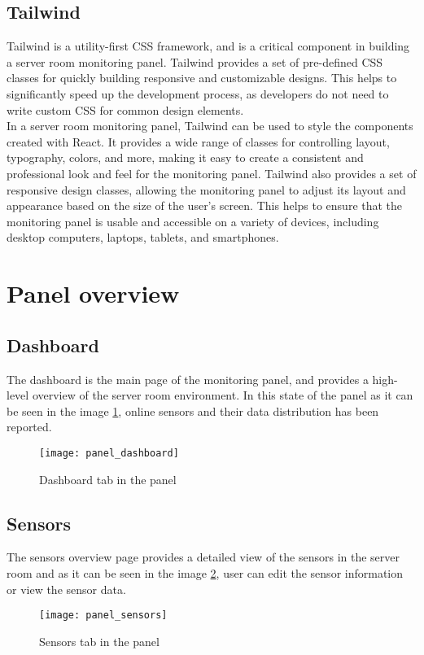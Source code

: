     \subsection{Tailwind}
    Tailwind is a utility-first CSS framework, and is a critical component in building a server room monitoring panel. Tailwind provides a set of pre-defined CSS classes for quickly building responsive and customizable designs. This helps to significantly speed up the development process, as developers do not need to write custom CSS for common design elements.\\
    In a server room monitoring panel, Tailwind can be used to style the components created with React. It provides a wide range of classes for controlling layout, typography, colors, and more, making it easy to create a consistent and professional look and feel for the monitoring panel. Tailwind also provides a set of responsive design classes, allowing the monitoring panel to adjust its layout and appearance based on the size of the user's screen. This helps to ensure that the monitoring panel is usable and accessible on a variety of devices, including desktop computers, laptops, tablets, and smartphones.\cite{tailwind}

\section{Panel overview}
    \subsection{Dashboard}
    The dashboard is the main page of the monitoring panel, and provides a high-level overview of the server room environment. In this state of the panel as it can be seen in the image \ref{panel_dashboard}, online sensors and their data distribution has been reported.
    \begin{figure}
        \centering
        \texttt{[image: panel\_dashboard]}
        \caption{Dashboard tab in the panel}
        \label{panel_dashboard}
    \end{figure}
    \subsection{Sensors}
    The sensors overview page provides a detailed view of the sensors in the server room and as it can be seen in the image \ref{panel_sensors}, user can edit the sensor information or view the sensor data.
    \begin{figure}
        \centering
        \texttt{[image: panel\_sensors]}
        \caption{Sensors tab in the panel}
        \label{panel_sensors}
    \end{figure}
